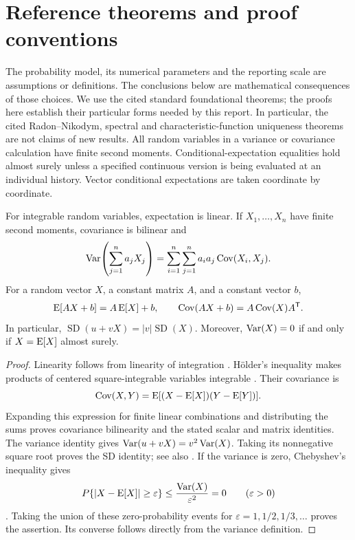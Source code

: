 \chapter{Reference theorems and proof conventions}
\label{sec:foundations}

The probability model, its numerical parameters and the reporting scale are
assumptions or definitions. The conclusions below are mathematical consequences
of those choices. We use the cited standard foundational theorems; the proofs
here establish their particular forms needed by this report. In particular,
the cited Radon--Nikodym, spectral and characteristic-function uniqueness
theorems are not claims of new results. All random variables in a variance or
covariance calculation have finite second moments. Conditional-expectation
equalities hold almost surely unless a specified continuous version is being
evaluated at an individual history. Vector conditional expectations are taken
coordinate by coordinate.

\begin{theorem}
\label{thm:moments}
For integrable random variables, expectation is linear. If \(X_1,\ldots,X_n\)
have finite second moments, covariance is bilinear and
\[
  \operatorname{Var}\!\left(\sum_{j=1}^{n}a_jX_j\right)
  =\sum_{i=1}^{n}\sum_{j=1}^{n}a_i a_j\operatorname{Cov}(X_i,X_j).
\]
For a random vector \(X\), a constant matrix \(A\), and a constant vector
\(b\),
\[
  \operatorname{E}[AX+b]=A\operatorname{E}[X]+b,\qquad
  \operatorname{Cov}(AX+b)=A\operatorname{Cov}(X)A^{\mathsf{T}}.
\]
In particular, \(\operatorname{SD}(u+vX)=|v|\operatorname{SD}(X)\).
Moreover, \(\operatorname{Var}(X)=0\) if and only if \(X=\operatorname{E}[X]\) almost surely.
\end{theorem}

\begin{proof}
Linearity follows from linearity of integration
\cite[Theorem~1.6.1]{durrett2019}. H\"older's inequality makes products
of centered square-integrable variables integrable
\cite[Theorem~1.6.3]{durrett2019}. Their covariance is
\[
  \operatorname{Cov}(X,Y)=\operatorname{E}[(X-\operatorname{E}[X])(Y-\operatorname{E}[Y])].
\]
Expanding this expression for finite linear combinations and distributing
the sums proves covariance bilinearity and the stated scalar and matrix
identities. The variance identity gives
\(\operatorname{Var}(u+vX)=v^2\operatorname{Var}(X)\). Taking its nonnegative square root proves
the SD identity; see also \cite[Section~4.2]{bertsekas2008}.
If the variance is zero, Chebyshev's inequality gives
\[
  P\{|X-\operatorname{E}[X]|\geq\varepsilon\}
  \leq\frac{\operatorname{Var}(X)}{\varepsilon^2}=0
  \qquad(\varepsilon>0)
\]
\cite[Theorem~1.6.4]{durrett2019}. Taking the union of these zero-probability
events for \(\varepsilon=1,1/2,1/3,\ldots\) proves the assertion. Its
converse follows directly from the variance definition.
\end{proof}

